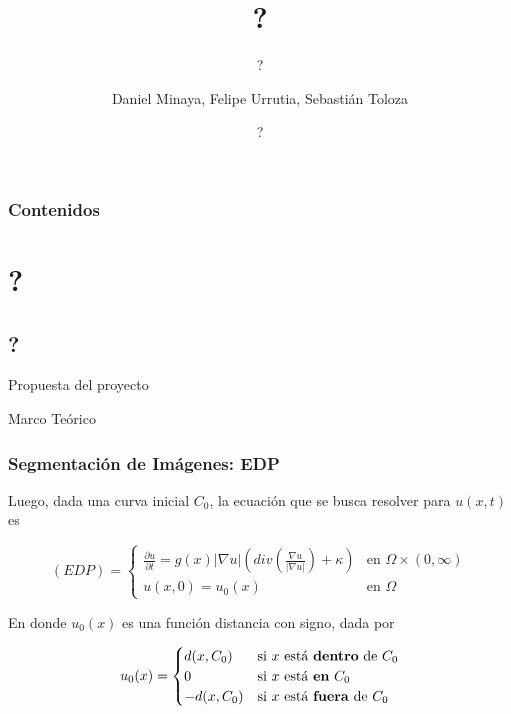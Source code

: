\documentclass{beamer}
\title[?] %
{?}
\subtitle{?}
\author[] %
{Daniel Minaya, Felipe Urrutia, Sebastián Toloza}
\institute[] %
{
  Departamento de Ingeniería Matemática, \\
  Universidad de Chile
}
\date[?] %
{?}
\begin{document}
\frame{\titlepage}


\begin{frame}
\frametitle{Contenidos}
\tableofcontents
\end{frame}
\section{?}
\subsection{?}

\begin{frame}{Propuesta del proyecto}
    
\end{frame}

\begin{frame}{Marco Teórico}
    
\end{frame}

\begin{frame}
\frametitle{Segmentación de Imágenes: EDP}

Luego, dada una curva inicial $C_0$, la ecuación que se busca resolver para $u(x,t)$ es

\begin{equation*}
    (EDP) = 
    \begin{cases}
    \frac{\partial u}{\partial t} =g(x)|\nabla u| \left( div\left( \frac{\nabla u}{|\nabla u|} \right)+\kappa \right) & \text{en } \Omega \times (0,\infty) \\
    u(x,0) = u_0(x) & \text{en } \Omega
    \end{cases}
\end{equation*}

En donde $u_0(x)$ es una función distancia con signo, dada por 

\begin{equation*}
    u_0(x)=
    \begin{cases}
    d(x,C_0) & \text{si $x$ está \textbf{dentro} de $C_0$}\\
    0 & \text{si $x$ está \textbf{en} $C_0$}\\
    -d(x,C_0)  & \text{si $x$ está \textbf{fuera} de $C_0$}
    \end{cases}
\end{equation*}

\end{frame}
\end{document}
